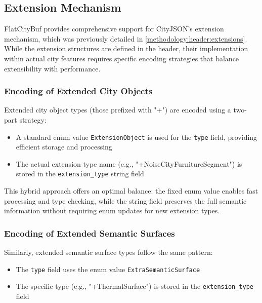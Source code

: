 \subsection{Extension Mechanism}
\label{methodology:feature_encoding:extension_mechanism}

FlatCityBuf provides comprehensive support for CityJSON's extension mechanism, which was previously detailed in \autoref{methodology:header:extensions}. While the extension structures are defined in the header, their implementation within actual city features requires specific encoding strategies that balance extensibility with performance.

\subsubsection{Encoding of Extended City Objects}
\label{methodology:feature_encoding:extension_mechanism:city_objects}

Extended city object types (those prefixed with "+") are encoded using a two-part strategy:

\begin{itemize}
  \item A standard enum value \texttt{ExtensionObject} is used for the \texttt{type} field, providing efficient storage and processing
  \item The actual extension type name (e.g., "+NoiseCityFurnitureSegment") is stored in the \texttt{extension\_type} string field
\end{itemize}

This hybrid approach offers an optimal balance: the fixed enum value enables fast processing and type checking, while the string field preserves the full semantic information without requiring enum updates for new extension types.

\subsubsection{Encoding of Extended Semantic Surfaces}
\label{methodology:feature_encoding:extension_mechanism:semantic_surfaces}

Similarly, extended semantic surface types follow the same pattern:

\begin{itemize}
  \item The \texttt{type} field uses the enum value \texttt{ExtraSemanticSurface}
  \item The specific type (e.g., "+ThermalSurface") is stored in the \texttt{extension\_type} field
\end{itemize}

